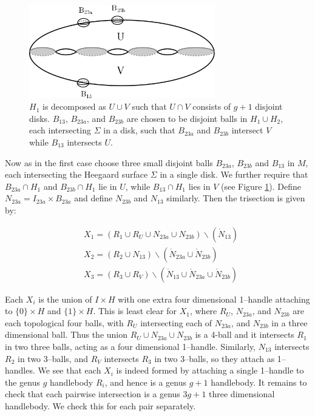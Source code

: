 \documentclass[12pt]{amsart}
\theoremstyle{definition}
\theoremstyle{remark}
\begin{document}
\begin{figure}[h]
\centering
\includegraphics[height=1.6in]{disjointballs.png}
\caption{$H_1$ is decomposed as $U \cup V$ such that $U \cap V$ consists of $g+1$ disjoint disks.  $B_{13}$, $B_{23a}$, and $B_{23b}$ are chosen to be disjoint balls in $H_1 \cup H_2$, each intersecting $\Sigma$ in a disk, such that $B_{23a}$ and $B_{23b}$ intersect $V$ while $B_{13}$ intersects $U$.}
\label{fig_disjointballs}
\end{figure}


Now as in the first case choose three small disjoint balls $B_{23a}$, $B_{23b}$ and $B_{13}$ in $M$, each intersecting the Heegaard surface $\Sigma$ in a single disk.  We further require that $B_{23a} \cap H_1$ and $B_{23b} \cap H_1$ lie in $U$, while $B_{13} \cap H_1$ lies in $V$ (see Figure \ref{fig_disjointballs}).  Define $N_{23a} = I_{23a} \times B_{23a}$ and define $N_{23b}$ and $N_{13}$ similarly.  Then the trisection is given by:

\begin{align*}
&X_1 = (R_1 \cup R_U \cup N_{23a} \cup N_{23b}) \backslash (\mathring N_{13}) \\
&X_2 = (R_2 \cup N_{13}) \backslash (\mathring N_{23a} \cup \mathring N_{23b}) \\
&X_3 = (R_3 \cup R_V) \backslash (\mathring N_{13} \cup \mathring N_{23a} \cup \mathring N_{23b}) 
\end{align*}

Each $X_i$ is the union of $I \times H$ with one extra four dimensional 1--handle attaching to $\{0\} \times H$ and $\{1\} \times H$.  This is least clear for $X_1$, where $R_U$, $N_{23a}$, and $N_{23b}$ are each topological four balls, with $R_U$ intersecting each of $N_{23a}$, and $N_{23b}$ in a three dimensional ball.  Thus the union $R_U \cup N_{23a} \cup N_{23b}$ is a 4-ball and it intersects $R_1$ in two three balls, acting as a four dimensional 1--handle.  Similarly, $N_{13}$ intersects $R_2$ in two 3--balls, and $R_V$ intersects $R_3$ in two 3--balls, so they attach as 1--handles.   We see that each $X_i$ is indeed formed by attaching a single 1--handle to the genus $g$ handlebody $R_i$, and hence is a genus $g+1$ handlebody.  It remains to check that each pairwise intersection is a genus $3g+1$ three dimensional handlebody.  We check this for each pair separately.
\end{document}
